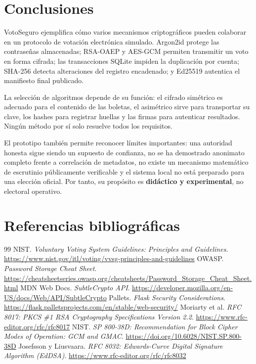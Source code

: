 \section{Conclusiones}

VotoSeguro ejemplifica cómo varios mecanismos criptográficos pueden colaborar en un protocolo de votación electrónica simulado. Argon2id protege las contraseñas almacenadas; RSA-OAEP y AES-GCM permiten transmitir un voto en forma cifrada; las transacciones SQLite impiden la duplicación por cuenta; SHA-256 detecta alteraciones del registro encadenado; y Ed25519 autentica el manifiesto final publicado.

La selección de algoritmos depende de su función: el cifrado simétrico es adecuado para el contenido de las boletas, el asimétrico sirve para transportar su clave, los hashes para registrar huellas y las firmas para autenticar resultados. Ningún método por sí solo resuelve todos los requisitos.

El prototipo también permite reconocer límites importantes: una autoridad honesta sigue siendo un supuesto de confianza, no se ha demostrado anonimato completo frente a correlación de metadatos, no existe un mecanismo matemático de escrutinio públicamente verificable y el sistema local no está preparado para una elección oficial. Por tanto, su propósito es \textbf{didáctico y experimental}, no electoral operativo.

\section*{Referencias bibliográficas}
\begin{thebibliography}{99}
 NIST. \emph{Voluntary Voting System Guidelines: Principles and Guidelines}. \url{https://www.nist.gov/itl/voting/vvsg-principles-and-guidelines}
 OWASP. \emph{Password Storage Cheat Sheet}. \url{https://cheatsheetseries.owasp.org/cheatsheets/Password_Storage_Cheat_Sheet.html}
 MDN Web Docs. \emph{SubtleCrypto API}. \url{https://developer.mozilla.org/en-US/docs/Web/API/SubtleCrypto}
 Pallets. \emph{Flask Security Considerations}. \url{https://flask.palletsprojects.com/en/stable/web-security/}
 Moriarty et al. \emph{RFC 8017: PKCS \#1 RSA Cryptography Specifications Version 2.2}. \url{https://www.rfc-editor.org/rfc/rfc8017}
 NIST. \emph{SP 800-38D: Recommendation for Block Cipher Modes of Operation: GCM and GMAC}. \url{https://doi.org/10.6028/NIST.SP.800-38D}
 Josefsson y Liusvaara. \emph{RFC 8032: Edwards-Curve Digital Signature Algorithm (EdDSA)}. \url{https://www.rfc-editor.org/rfc/rfc8032}
\end{thebibliography}


